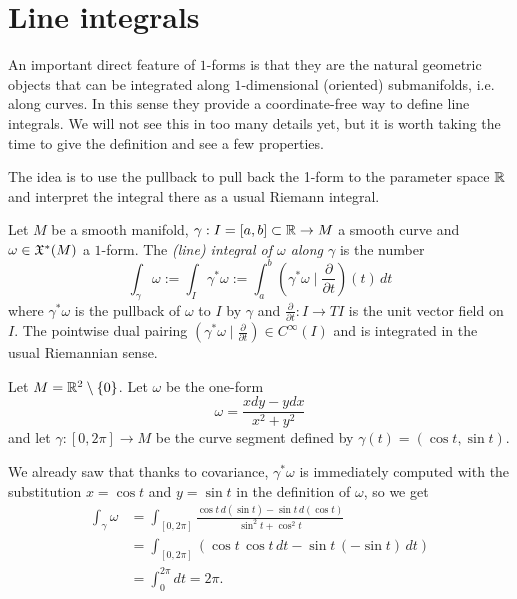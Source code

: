 \section{Line integrals}

An important direct feature of $1$-forms is that they are the natural geometric objects that can be integrated along $1$-dimensional (oriented) submanifolds, i.e. along curves.
In this sense they provide a coordinate-free way to define line integrals.
We will not see this in too many details yet, but it is worth taking the time to give the definition and see a few properties.

The idea is to use the pullback to pull back the 1-form to the parameter space $\mathbb{R}$ and interpret the integral there as a usual Riemann integral.

\begin{definition}
  Let $M$ be a smooth manifold, $\gamma: I = [a,b]\subset \mathbb{R} \to M$ a smooth curve and $\omega\in\mathfrak{X}^*(M)$ a $1$-form.
  The \emph{(line) integral of $\omega$ along $\gamma$} is the number
  \begin{equation}
    \int_\gamma \omega :=
    \int_I \gamma^*\omega :=
    \int_a^b \left(\gamma^*\omega \mid \frac{\partial}{\partial t}\right)(t)\, dt
  \end{equation}
  where $\gamma^*\omega$ is the pullback of $\omega$ to $I$ by $\gamma$ and $\frac{\partial}{\partial t}: I \to TI$ is the unit vector field on $I$.
  The pointwise dual pairing $\left(\gamma^*\omega \mid \frac{\partial}{\partial t}\right)\in C^\infty(I)$ and is integrated in the usual Riemannian sense.
\end{definition}

\begin{example}\label{ex:li}
  Let $M=\mathbb{R}^2\setminus\{0\}$. Let $\omega$ be the one-form
  \begin{equation}
    \omega = \frac{x dy - y dx}{x^2 + y^2}
  \end{equation}
  and let $\gamma:[0,2\pi]\to M$ be the curve segment defined by $\gamma(t) = (\cos t, \sin t)$.

  We already saw that thanks to covariance, $\gamma^*\omega$ is immediately computed with the substitution $x=\cos t$ and $y=\sin t$ in the definition of $\omega$, so we get
  \begin{align}
    \int_\gamma \omega
     & = \int_{[0,2\pi]} \frac{\cos t\, d(\sin t) - \sin t \, d(\cos t)}{\sin^2 t + \cos^2 t} \\
     & = \int_{[0,2\pi]} (\cos t\, \cos t\, dt - \sin t \, (-\sin t)\, dt)                    \\
     & = \int_0^{2\pi} dt = 2\pi.
  \end{align}
\end{example}

